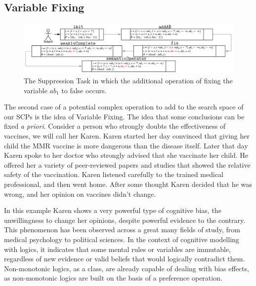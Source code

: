 \documentclass[
11pt, %
english, %
singlespacing, %
headsepline, %
]{MastersDoctoralThesis} %
\begin{document}
\subsection*{Variable Fixing} \label{ssec:variableFixing}

\begin{figure}
\begin{center}
\includegraphics[width=\linewidth]{suppressionSCP_mod2}
\end{center}

\caption{The Suppression Task in which the additional operation of fixing the variable $ab_1$ to false occurs.}
\label{fig:supmod2}
\end{figure}

The second case of a potential complex operation to add to the search space of our SCPs is the idea of Variable Fixing. The idea that some  conclusions can be fixed \textit{a priori}. Consider a person who strongly doubts the effectiveness of vaccines, we will call her Karen. Karen started her day convinced that giving her child the MMR vaccine is more dangerous than the disease itself. Later that day Karen spoke to her doctor who strongly advised that she vaccinate her child. He offered her a variety of peer-reviewed papers and studies that showed the relative safety of the vaccination. Karen listened carefully to the trained medical professional, and then went home. After some thought Karen decided that he was wrong, and her opinion on vaccines didn't change.

In this example Karen shows a very powerful type of cognitive bias, the unwillingness to change her opinions, despite powerful evidence to the contrary. This phenomenon has been observed across a great many fields of study, from medical psychology \citep{brown2010omission} \citep{wroe2005feeling} to political sciences\citep{tappin2017heart}. In the context of cognitive modelling with logics, it indicates that some mental rules or variables are immutable, regardless of new evidence or valid beliefs that would logically contradict them. Non-monotonic logics, as a class, are already capable of dealing with bias effects, as non-monotonic logics are built on the basis of a preference operation.
\end{document}
